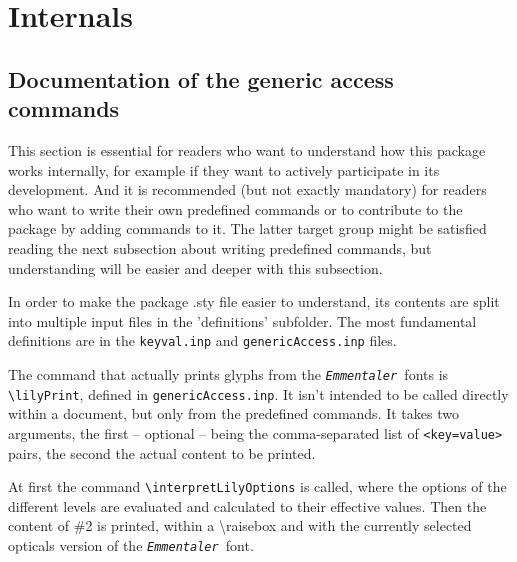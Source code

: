 \documentclass{article}
\newcommand*{\emmentaler}{\texttt{\textit{Emmentaler }}}
\newcommand*{\cmd}[1]{\texttt{\textbackslash #1}}
\begin{document}
\section{Internals}

\subsection{Documentation of the generic access commands}
This section is essential for readers who want to understand how this package works internally, for example if they want to actively participate in its development.
And it is recommended (but not exactly mandatory) for readers who want to write their own predefined commands or to contribute to the package by adding commands to it. 
The latter target group might be satisfied reading the next subsection about writing predefined commands, but understanding will be easier and deeper with this subsection.

\medskip
In order to make the package .sty file easier to understand, its contents are split into multiple input files in the 'definitions' subfolder. 
The most fundamental definitions are in the \texttt{keyval.inp} and \texttt{genericAccess.inp} files.

\medskip
The command that actually prints glyphs from the \emmentaler fonts is \cmd{lilyPrint}, defined in \texttt{genericAccess.inp}.
It isn't intended to be called directly within a document, but only from the predefined commands.
It takes two arguments, the first -- optional -- being the comma-separated list of \texttt{<key=value>} pairs, the second the actual content to be printed.

At first the command \cmd{interpretLilyOptions} is called, where the options of the different levels are evaluated and calculated to their effective values.
Then the content of \#2 is printed, within a \textbackslash raisebox and with the currently selected opticals version of the \emmentaler font.
\end{document}
